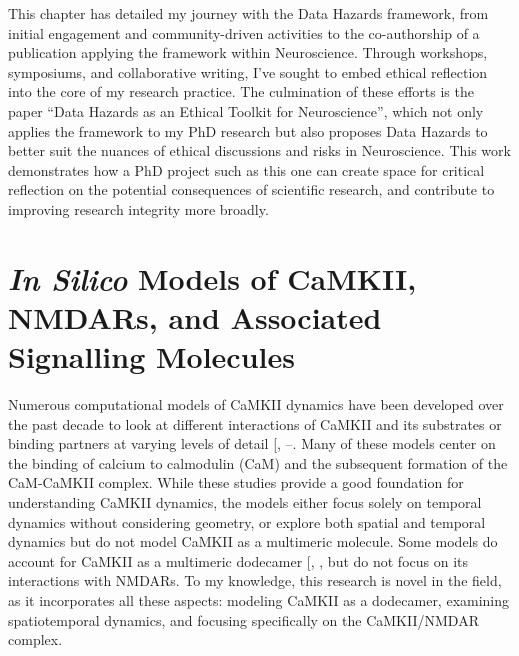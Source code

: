 \documentclass[
  11pt,
  letterpaper,
]{scrreprt}
\begin{document}

This chapter has detailed my journey with the Data Hazards framework,
from initial engagement and community-driven activities to the
co-authorship of a publication applying the framework within
Neuroscience. Through workshops, symposiums, and collaborative writing,
I've sought to embed ethical reflection into the core of my research
practice. The culmination of these efforts is the paper ``Data Hazards
as an Ethical Toolkit for Neuroscience'', which not only applies the
framework to my PhD research but also proposes Data Hazards to better
suit the nuances of ethical discussions and risks in Neuroscience. This
work demonstrates how a PhD project such as this one can create space
for critical reflection on the potential consequences of scientific
research, and contribute to improving research integrity more broadly.


\chapter{\texorpdfstring{\emph{In Silico} Models of CaMKII, NMDARs, and
Associated Signalling
Molecules}{In Silico Models of CaMKII, NMDARs, and Associated Signalling Molecules}}\label{sec-model-description}

Numerous computational models of CaMKII dynamics have been developed
over the past decade to look at different interactions of CaMKII and its
substrates or binding partners at varying levels of detail
{[},
--\citeproc{ref-bartol2024Spatial}{437}{]}.
Many of these models center on the binding of calcium to calmodulin
(CaM) and the subsequent formation of the CaM-CaMKII complex. While
these studies provide a good foundation for understanding CaMKII
dynamics, the models either focus solely on temporal dynamics without
considering geometry, or explore both spatial and temporal dynamics but
do not model CaMKII as a multimeric molecule. Some models do account for
CaMKII as a multimeric dodecamer
{[},
,
\citeproc{ref-bartol2024Spatial}{437}{]} but do not focus on its
interactions with NMDARs. To my knowledge, this research is novel in the
field, as it incorporates all these aspects: modeling CaMKII as a
dodecamer, examining spatiotemporal dynamics, and focusing specifically
on the CaMKII/NMDAR complex.
\end{document}
